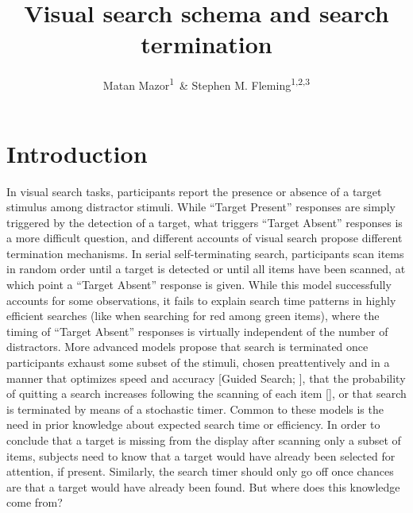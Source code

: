 \documentclass[
  english,
  man]{apa6}
\author{Matan Mazor\textsuperscript{1}\ \& Stephen M. Fleming\textsuperscript{1,2,3}}
\affiliation{
\vspace{0.5cm}
\textsuperscript{1} Wellcome Centre for Human Neuroimaging, UCL\\\textsuperscript{2} Max Planck UCL Centre for Computational Psychiatry and Ageing Research\\\textsuperscript{3} Department of Experimental Psychology, UCL}
\title{Visual search schema and search termination}
\date{}
\begin{document}
\maketitle

\hypertarget{introduction}{%
\section{Introduction}\label{introduction}}

In visual search tasks, participants report the presence or absence of a target stimulus among distractor stimuli. While \enquote{Target Present} responses are simply triggered by the detection of a target, what triggers \enquote{Target Absent} responses is a more difficult question, and different accounts of visual search propose different termination mechanisms. In serial self-terminating search, participants scan items in random order until a target is detected or until all items have been scanned, at which point a \enquote{Target Absent} response is given. While this model successfully accounts for some observations, it fails to explain search time patterns in highly efficient searches (like when searching for red among green items), where the timing of \enquote{Target Absent} responses is virtually independent of the number of distractors. More advanced models propose that search is terminated once participants exhaust some subset of the stimuli, chosen preattentively and in a manner that optimizes speed and accuracy {[}Guided Search; {]}, that the probability of quitting a search increases following the scanning of each item {[}{]}, or that search is terminated by means of a stochastic timer. Common to these models is the need in prior knowledge about expected search time or efficiency. In order to conclude that a target is missing from the display after scanning only a subset of items, subjects need to know that a target would have already been selected for attention, if present. Similarly, the search timer should only go off once chances are that a target would have already been found. But where does this knowledge come from?
\end{document}
